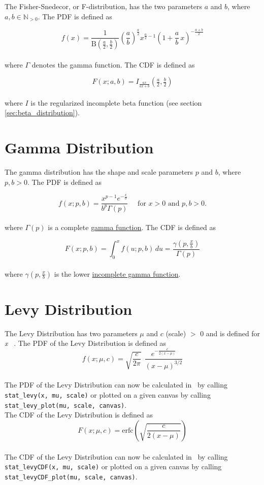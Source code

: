 		The Fisher-Snedecor, or F-distribution, has the two parameters $a$ and $b$, where $a,b \in \mathbb{N}_{>0}$. The \ac{PDF} is defined as

		$$
			f(x) = \frac{1}{\mathrm{B}\!\left(\frac{a}{2},\frac{b}{2}\right)} \left(\frac{a}{b}\right)^{\frac{a}{2}} x^{\frac{a}{2} - 1} \left(1+\frac{a}{b}\,x\right)^{-\frac{a+b}{2}}
		$$
		\\[0.3cm]
		where $\Gamma$ denotes the gamma function.
		The \ac{CDF} is defined as

		$$F(x; a,b)=I_{\frac{a x}{a x + b}}\left (\tfrac{a}{2}, \tfrac{b}{2} \right)$$
		\\[0.3cm]
		where $I$ is the regularized incomplete beta function (see section \ref{sec:beta_distribution}).

	\section{Gamma Distribution}

		The gamma distribution has the shape and scale parameters $p$ and $b$, where $p,b > 0$. The \ac{PDF} is defined as

		$$f(x;p,b) =  \frac{x^{p-1}e^{-\frac{x}{b}}}{b^p\Gamma(p)} \quad \text{ for } x > 0 \text{ and } p, b > 0.$$
		\\[0.3cm]
		where $\Gamma(p)$ is a complete \href{https://en.wikipedia.org/wiki/Gamma_function}{gamma function}.		The \ac{CDF} is defined as

		$$F(x;p,b) = \int_0^x f(u;p,b)\,du = \frac{\gamma\left(p, \frac{x}{b}\right)}{\Gamma(p)}$$
		\\[0.3cm]
		where $\gamma\left(p, \frac{x}{b}\right)$ is the lower \href{https://en.wikipedia.org/wiki/Incomplete_gamma_function}{incomplete gamma function}.

	\section{Levy Distribution}
	
		The Levy Distribution has two parameters $\mu$ and $c$ (scale) $>$ 0 and is defined for \textit{x} \geq\ \mu. The \ac{PDF} of the Levy Distribution is defined as
		\\[0.3cm]
		$$f(x;\mu,c)=\sqrt{\frac{c}{2\pi}}~~\frac{e^{ -\frac{c}{2(x-\mu)}}} {(x-\mu)^{3/2}}$$
		\\[0.3cm]
		The \ac{PDF} of the Levy Distribution can now be calculated in \setlx\ by calling \lstinline{stat_levy(x, mu, scale)} or plotted on a given canvas by calling \lstinline{stat_levy_plot(mu, scale, canvas)}.
		\\[0.3cm]
		The \ac{CDF} of the Levy Distribution is defined as
		\\[0.3cm]
		$$F(x;\mu,c)=\textrm{erfc}\left(\sqrt{\frac{c}{2(x-\mu)}}\right)$$
		\\[0.3cm]
		The \ac{CDF} of the Levy Distribution can now be calculated in \setlx\ by calling \lstinline{stat_levyCDF(x, mu, scale)} or plotted on a given canvas by calling \lstinline{stat_levyCDF_plot(mu, scale, canvas)}.


